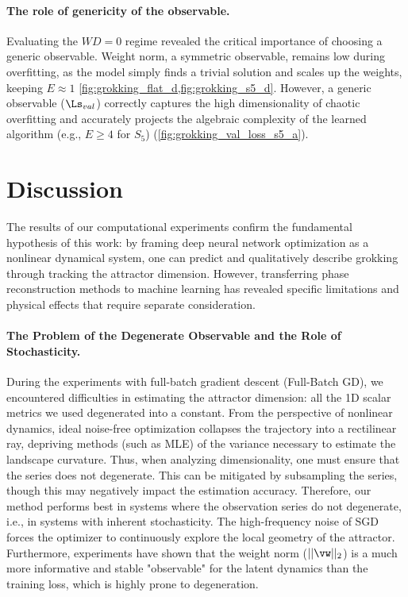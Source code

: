 \documentclass{article}
\begin{document}
\paragraph{The role of genericity of the observable.} Evaluating the $WD=0$ regime revealed the critical importance of choosing a generic observable. Weight norm, a symmetric observable, remains low during overfitting, as the model simply finds a trivial solution and scales up the weights, keeping $E \approx 1$ \cref{fig:grokking_flat_d,fig:grokking_s5_d}. However, a generic observable ($\Ls_{val}$) correctly captures the high dimensionality of chaotic overfitting and accurately projects the algebraic complexity of the learned algorithm (e.g., $E \ge 4$ for $S_5$) (\cref{fig:grokking_val_loss_s5_a}).

\section{Discussion}\label{sec:disc}

The results of our computational experiments confirm the fundamental hypothesis of this work: by framing deep neural network optimization as a nonlinear dynamical system, one can predict and qualitatively describe grokking through tracking the attractor dimension. However, transferring phase reconstruction methods to machine learning has revealed specific limitations and physical effects that require separate consideration.

\paragraph{The Problem of the Degenerate Observable and the Role of Stochasticity.}
During the experiments with full-batch gradient descent (Full-Batch GD), we encountered difficulties in estimating the attractor dimension: all the 1D scalar metrics we used degenerated into a constant. From the perspective of nonlinear dynamics, ideal noise-free optimization collapses the trajectory into a rectilinear ray, depriving methods (such as MLE) of the variance necessary to estimate the landscape curvature. Thus, when analyzing dimensionality, one must ensure that the series does not degenerate. This can be mitigated by subsampling the series, though this may negatively impact the estimation accuracy. Therefore, our method performs best in systems where the observation series do not degenerate, i.e., in systems with inherent stochasticity. The high-frequency noise of SGD forces the optimizer to continuously explore the local geometry of the attractor. Furthermore, experiments have shown that the weight norm ($||\vw||_2$) is a much more informative and stable "observable" for the latent dynamics than the training loss, which is highly prone to degeneration.
\end{document}
